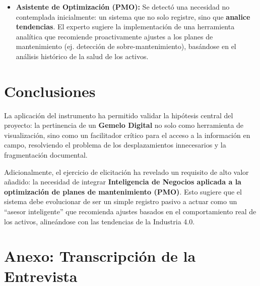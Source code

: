 \documentclass[12pt, a4paper]{article}
\begin{document}
\begin{itemize}
    \item \textbf{Asistente de Optimización (PMO):} Se detectó una necesidad no contemplada inicialmente: un sistema que no solo registre, sino que \textbf{analice tendencias}. El experto sugiere la implementación de una herramienta analítica que recomiende proactivamente ajustes a los planes de mantenimiento (ej. detección de sobre-mantenimiento), basándose en el análisis histórico de la salud de los activos.
\end{itemize}

\section{Conclusiones}

La aplicación del instrumento ha permitido validar la hipótesis central del proyecto: la pertinencia de un \textbf{Gemelo Digital} no solo como herramienta de visualización, sino como un facilitador crítico para el acceso a la información en campo, resolviendo el problema de los desplazamientos innecesarios y la fragmentación documental.

Adicionalmente, el ejercicio de elicitación ha revelado un requisito de alto valor añadido: la necesidad de integrar \textbf{Inteligencia de Negocios aplicada a la optimización de planes de mantenimiento (PMO)}. Esto sugiere que el sistema debe evolucionar de ser un simple registro pasivo a actuar como un ``asesor inteligente'' que recomienda ajustes basados en el comportamiento real de los activos, alineándose con las tendencias de la Industria 4.0.

\clearpage
\printbibliography[heading=bibintoc,title=Referencias]

\clearpage
\appendix
\section{Anexo: Transcripción de la Entrevista}
\end{document}
